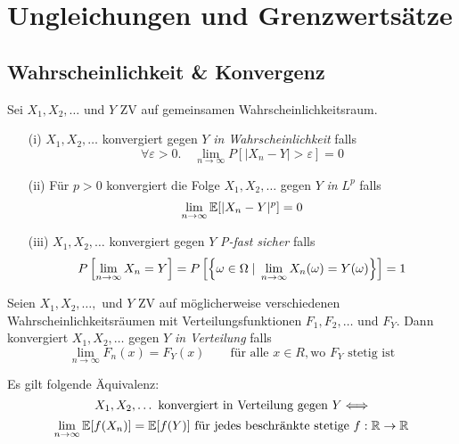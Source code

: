 \section{Ungleichungen und Grenzwertsätze}
\subsection{Wahrscheinlichkeit \& Konvergenz}
\begin{definition}
Sei $X_1,X_2,\dots$ und $Y$ ZV auf gemeinsamen Wahrscheinlichkeitsraum.
\begin{itemize}
\item[(i)] $X_1,X_2,\dots$ konvergiert gegen $Y$ \textit{in Wahrscheinlichkeit} falls $$\forall \varepsilon >0. \quad \lim_{n\to \infty} P[ |X_n -Y| > \varepsilon] = 0$$
\item[(ii)] Für $p>0$ konvergiert die Folge $X_1,X_2,\dots$ gegen $Y$ \textit{in} $L^p$ falls $$\lim_{n\to\infty} \mathbb{E}[ |X_n - Y|^p] = 0$$
\item[(iii)] $X_1,X_2,\dots$ konvergiert gegen $Y$ \textit{P-fast sicher} falls $$ P\left[ \lim_{n\to\infty} X_n = Y \right] = P \left[ \left \{ \omega \in \Omega \;|\; \lim_{n\to\infty} X_n(\omega) = Y(\omega) \right \} \right] = 1$$
\end{itemize}
\end{definition}

\begin{definition}
Seien $X_1,X_2,\dots,$ und $Y$ ZV auf möglicherweise verschiedenen Wahrscheinlichkeitsräumen mit Verteilungsfunktionen $F_1,F_2,\dots$ und $F_Y$. Dann konvergiert $X_1,X_2, \dots$ gegen $Y$ \textit{in Verteilung} falls
$$ \lim_{n\to\infty} F_n(x) = F_Y(x) \quad \quad \mbox{für alle } x\in R, \mbox{wo } F_Y \mbox{ stetig ist}$$
\end{definition}

\begin{satz}
Es gilt folgende Äquivalenz:
$$ X_1,X_2,\dots \mbox{ konvergiert in Verteilung gegen } Y\Longleftrightarrow$$ $$ \lim_{n\to\infty} \mathbb{E}[f(X_n)] = \mathbb{E}[f(Y)] \mbox{ für jedes beschränkte stetige } f:\mathbb{R}\to\mathbb{R}$$
\end{satz}
\newpage
